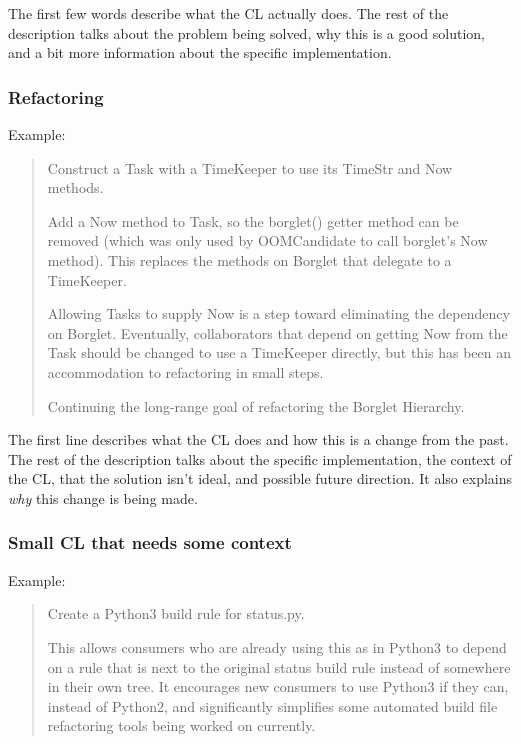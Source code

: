 \documentclass[
]{article}
\begin{document}
The first few words describe what the CL actually does. The rest of the
description talks about the problem being solved, why this is a good
solution, and a bit more information about the specific implementation.

\subsubsection{Refactoring}\label{refactoring}

Example:

\begin{quote}
Construct a Task with a TimeKeeper to use its TimeStr and Now methods.

Add a Now method to Task, so the borglet() getter method can be removed
(which was only used by OOMCandidate to call borglet's Now method). This
replaces the methods on Borglet that delegate to a TimeKeeper.

Allowing Tasks to supply Now is a step toward eliminating the dependency
on Borglet. Eventually, collaborators that depend on getting Now from
the Task should be changed to use a TimeKeeper directly, but this has
been an accommodation to refactoring in small steps.

Continuing the long-range goal of refactoring the Borglet Hierarchy.
\end{quote}

The first line describes what the CL does and how this is a change from
the past. The rest of the description talks about the specific
implementation, the context of the CL, that the solution isn't ideal,
and possible future direction. It also explains \emph{why} this change
is being made.

\subsubsection{Small CL that needs some
context}\label{small-cl-that-needs-some-context}

Example:

\begin{quote}
Create a Python3 build rule for status.py.

This allows consumers who are already using this as in Python3 to depend
on a rule that is next to the original status build rule instead of
somewhere in their own tree. It encourages new consumers to use Python3
if they can, instead of Python2, and significantly simplifies some
automated build file refactoring tools being worked on currently.
\end{quote}
\end{document}
